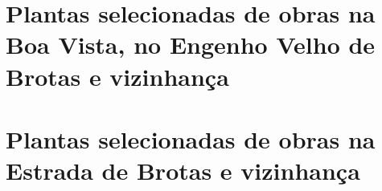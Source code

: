 \begin{anexosenv}


\chapter{Plantas selecionadas de obras na Boa Vista, no Engenho Velho de Brotas e vizinhança}


\chapter{Plantas selecionadas de obras na Estrada de Brotas e vizinhança}


\end{anexosenv}
